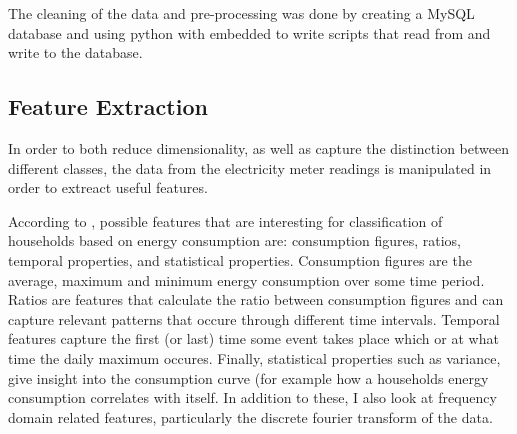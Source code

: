 \documentclass[12pt,a4paper]{article}
\begin{document}
The cleaning of the data and pre-processing was done by creating a MySQL database and using python with embedded to write scripts that read from and write to the database.


\subsection*{Feature Extraction}

In order to both reduce dimensionality, as well as capture the distinction between different classes, the data from the electricity meter readings is manipulated in order to extreact useful features.

According to \cite{Beckel 2}, possible features that are interesting for classification of households based on energy consumption are: consumption figures, ratios, temporal properties, and statistical properties. Consumption figures are the average, maximum and minimum energy consumption over some time period. Ratios are features that calculate the ratio between consumption figures and can capture relevant patterns that occure through different time intervals. Temporal features capture the first (or last) time some event takes place which or at what time the daily maximum occures. Finally, statistical properties such as variance, give insight into the consumption curve (for example how a households energy consumption correlates with itself. In addition to these, I also look at frequency domain related features, particularly the discrete fourier transform of the data. 
\newline
\end{document}
